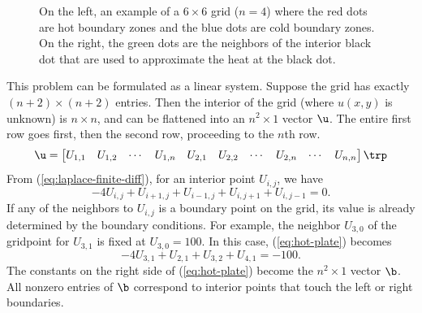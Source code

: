 \begin{figure}
\centering
{}
\caption{On the left, an example of a $6\times 6$ grid ($n=4$) where the red dots are hot boundary zones and the blue dots are cold boundary zones.
On the right, the green dots are the neighbors of the interior black dot that are used to approximate the heat at the black dot.}
\label{fig:itersolve-finite-difference-grid}
\end{figure}
%
This problem can be formulated as a linear system.
Suppose the grid has exactly $(n+2)\times (n+2)$ entries.
Then the interior of the grid (where $u(x,y)$ is unknown) is $n\times n$, and can be flattened into an $n^2\times 1$ vector $\u$.
The entire first row goes first, then the second row, proceeding to the $n$th row.
\[\u = \begin{bmatrix}U_{1,1} & U_{1,2} & \cdots & U_{1,n} & U_{2,1} & U_{2,2} & \cdots & U_{2,n} & \cdots & U_{n,n}\end{bmatrix}\trp\]
From (\ref{eq:laplace-finite-diff}), for an interior point $U_{i,j}$, we have
\begin{equation}
-4U_{i,j} + U_{i+1,j} + U_{i-1,j} + U_{i,j+1} +  U_{i,j-1} = 0.
\label{eq:hot-plate}
\end{equation}
If any of the neighbors to $U_{i,j}$ is a boundary point on the grid, its value is already determined by the boundary conditions.
For example, the neighbor $U_{3,0}$ of the gridpoint for $U_{3,1}$ is fixed at $U_{3,0} = 100$.
In this case, (\ref{eq:hot-plate}) becomes
\[
-4U_{3,1} + U_{2,1} + U_{3,2} + U_{4,1} = -100.
\]
The constants on the right side of (\ref{eq:hot-plate}) become the $n^2\times 1$ vector $\b$.
All nonzero entries of $\b$ correspond to interior points that touch the left or right boundaries.

